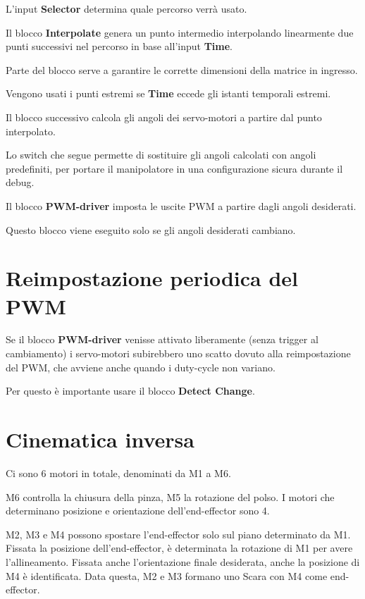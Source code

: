 \documentclass[12pt]{report}
\begin{document}
L'input \textbf{Selector} determina quale percorso verrà usato.

Il blocco \textbf{Interpolate} genera un punto intermedio interpolando linearmente due punti successivi nel percorso in base all'input \textbf{Time}.

Parte del blocco serve a garantire le corrette dimensioni della matrice in ingresso.

Vengono usati i punti estremi se \textbf{Time} eccede gli istanti temporali estremi.

Il blocco successivo calcola gli angoli dei servo-motori a partire dal punto interpolato.

Lo switch che segue permette di sostituire gli angoli calcolati con angoli predefiniti, per portare il manipolatore in una configurazione sicura durante il debug.

Il blocco \textbf{PWM-driver} imposta le uscite PWM a partire dagli angoli desiderati.

Questo blocco viene eseguito solo se gli angoli desiderati cambiano.

\section{Reimpostazione periodica del PWM}

Se il blocco \textbf{PWM-driver} venisse attivato liberamente (senza trigger al cambiamento) i servo-motori subirebbero uno scatto dovuto alla reimpostazione del PWM, che avviene anche quando i duty-cycle non variano.

Per questo è importante usare il blocco \textbf{Detect Change}. 

\section{Cinematica inversa}

Ci sono 6 motori in totale, denominati da M1 a M6.

M6 controlla la chiusura della pinza, M5 la rotazione del polso. I motori che determinano posizione e orientazione dell'end-effector sono 4.

M2, M3 e M4 possono spostare l'end-effector solo sul piano determinato da M1. Fissata la posizione dell'end-effector, è determinata la rotazione di M1 per avere l'allineamento. Fissata anche l'orientazione finale desiderata, anche la posizione di M4 è identificata. Data questa, M2 e M3 formano uno Scara con M4 come end-effector.
\end{document}
